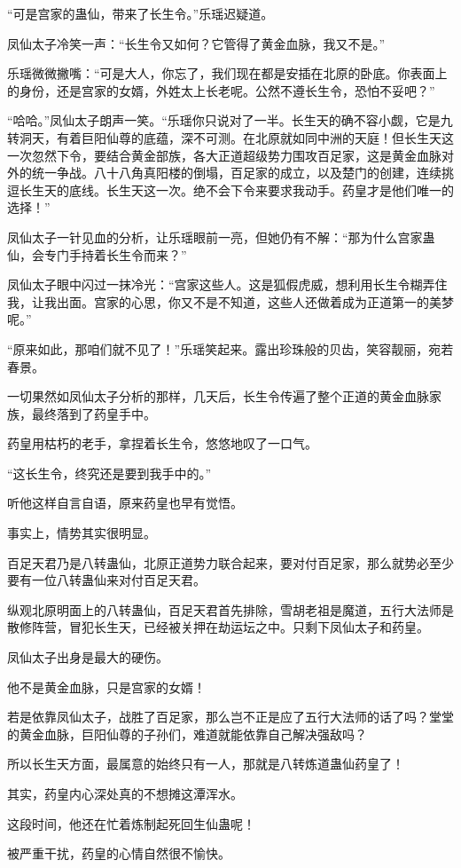 \begin{this_body}
“可是宫家的蛊仙，带来了长生令。”乐瑶迟疑道。

凤仙太子冷笑一声：“长生令又如何？它管得了黄金血脉，我又不是。”

乐瑶微微撇嘴：“可是大人，你忘了，我们现在都是安插在北原的卧底。你表面上的身份，还是宫家的女婿，外姓太上长老呢。公然不遵长生令，恐怕不妥吧？”

“哈哈。”凤仙太子朗声一笑。“乐瑶你只说对了一半。长生天的确不容小觑，它是九转洞天，有着巨阳仙尊的底蕴，深不可测。在北原就如同中洲的天庭！但长生天这一次忽然下令，要结合黄金部族，各大正道超级势力围攻百足家，这是黄金血脉对外的统一争战。八十八角真阳楼的倒塌，百足家的成立，以及楚门的创建，连续挑逗长生天的底线。长生天这一次。绝不会下令来要求我动手。药皇才是他们唯一的选择！”

凤仙太子一针见血的分析，让乐瑶眼前一亮，但她仍有不解：“那为什么宫家蛊仙，会专门手持着长生令而来？”

凤仙太子眼中闪过一抹冷光：“宫家这些人。这是狐假虎威，想利用长生令糊弄住我，让我出面。宫家的心思，你又不是不知道，这些人还做着成为正道第一的美梦呢。”

“原来如此，那咱们就不见了！”乐瑶笑起来。露出珍珠般的贝齿，笑容靓丽，宛若春景。

一切果然如凤仙太子分析的那样，几天后，长生令传遍了整个正道的黄金血脉家族，最终落到了药皇手中。

药皇用枯朽的老手，拿捏着长生令，悠悠地叹了一口气。

“这长生令，终究还是要到我手中的。”

听他这样自言自语，原来药皇也早有觉悟。

事实上，情势其实很明显。

百足天君乃是八转蛊仙，北原正道势力联合起来，要对付百足家，那么就势必至少要有一位八转蛊仙来对付百足天君。

纵观北原明面上的八转蛊仙，百足天君首先排除，雪胡老祖是魔道，五行大法师是散修阵营，冒犯长生天，已经被关押在劫运坛之中。只剩下凤仙太子和药皇。

凤仙太子出身是最大的硬伤。

他不是黄金血脉，只是宫家的女婿！

若是依靠凤仙太子，战胜了百足家，那么岂不正是应了五行大法师的话了吗？堂堂的黄金血脉，巨阳仙尊的子孙们，难道就能依靠自己解决强敌吗？

所以长生天方面，最属意的始终只有一人，那就是八转炼道蛊仙药皇了！

其实，药皇内心深处真的不想摊这潭浑水。

这段时间，他还在忙着炼制起死回生仙蛊呢！

被严重干扰，药皇的心情自然很不愉快。


\end{this_body}
